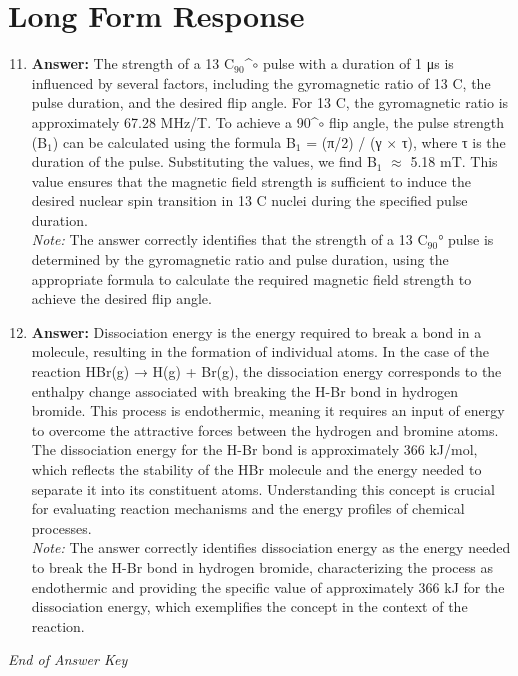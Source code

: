 \documentclass[12pt]{article}
\begin{document}
\section*{Long Form Response}
\begin{enumerate}[label=\arabic*.]
\setcounter{enumi}{10}
\item \textbf{Answer:} The strength of a 13 C$_{90}$^\ensuremath{\circ} pulse with a duration of 1 μs is influenced by several factors, including the gyromagnetic ratio of 13 C, the pulse duration, and the desired flip angle. For 13 C, the gyromagnetic ratio is approximately 67.28 MHz/T. To achieve a 90^\ensuremath{\circ} flip angle, the pulse strength (B$_{1}$) can be calculated using the formula B$_{1}$ = (π/2) / (γ \ensuremath{\times} τ), where τ is the duration of the pulse. Substituting the values, we find B$_{1}$ \ensuremath{\approx} 5.18 mT. This value ensures that the magnetic field strength is sufficient to induce the desired nuclear spin transition in 13 C nuclei during the specified pulse duration.
\\ \textit{Note:} The answer correctly identifies that the strength of a 13 C$_{90}$° pulse is determined by the gyromagnetic ratio and pulse duration, using the appropriate formula to calculate the required magnetic field strength to achieve the desired flip angle.
\item \textbf{Answer:} Dissociation energy is the energy required to break a bond in a molecule, resulting in the formation of individual atoms. In the case of the reaction HBr(g) → H(g) + Br(g), the dissociation energy corresponds to the enthalpy change associated with breaking the H-Br bond in hydrogen bromide. This process is endothermic, meaning it requires an input of energy to overcome the attractive forces between the hydrogen and bromine atoms. The dissociation energy for the H-Br bond is approximately 366 kJ/mol, which reflects the stability of the HBr molecule and the energy needed to separate it into its constituent atoms. Understanding this concept is crucial for evaluating reaction mechanisms and the energy profiles of chemical processes.
\\ \textit{Note:} The answer correctly identifies dissociation energy as the energy needed to break the H-Br bond in hydrogen bromide, characterizing the process as endothermic and providing the specific value of approximately 366 kJ for the dissociation energy, which exemplifies the concept in the context of the reaction.
\end{enumerate}

\vfill
\noindent\textit{End of Answer Key}
\end{document}
